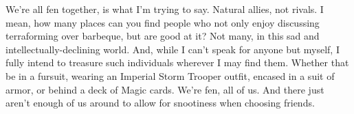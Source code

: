 We're all fen together, is what I'm trying to say. Natural allies, not rivals. I mean, how many places can you find people who not only enjoy discussing terraforming over barbeque, but are good at it? Not many, in this sad and intellectually-declining world. And, while I can't speak for anyone but myself, I fully intend to treasure such individuals wherever I may find them. Whether that be in a fursuit, wearing an Imperial Storm Trooper outfit, encased in a suit of armor, or behind a deck of Magic cards. We're fen, all of us. And there just aren't enough of us around to allow for snootiness when choosing friends.
